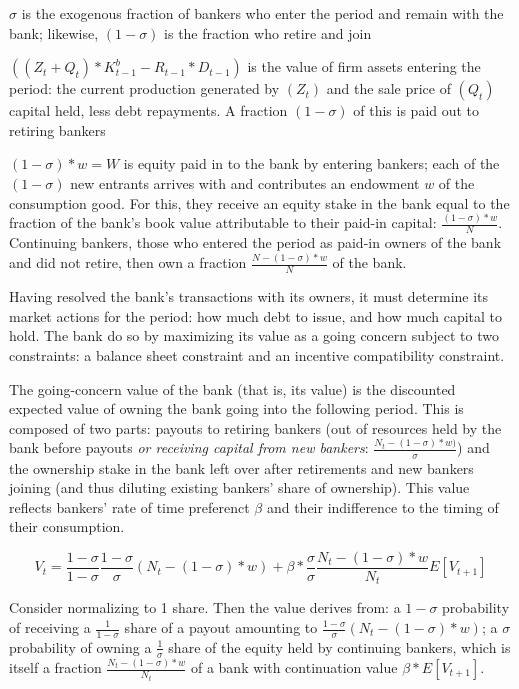 \documentclass[english]{article}
\begin{document}
$\sigma$ is the exogenous fraction of bankers who enter the period and remain with the bank; likewise, $(1-\sigma)$ is the fraction who retire and join

$\left((Z_t + Q_t)*K^b_{t-1} - R_{t-1}*D_{t-1}\right)$ is the value of firm assets entering the period:
the current production generated by $(Z_t)$ and the sale price of $(Q_t)$ capital held, less debt repayments. A fraction 
$(1-\sigma)$ of this is paid out to retiring bankers

$(1 - \sigma)*w=W$ is equity paid in to the bank by entering bankers; each of the $(1-\sigma)$ new entrants
arrives with and contributes an endowment $w$ of the consumption good. For this, they receive an
equity stake in the bank equal to the fraction of the bank's book value attributable to their paid-in 
capital: $\frac{(1 - \sigma)*w}{N}$. Continuing bankers, those 
who entered the period as paid-in owners of the bank and did not retire, then own a fraction 
$\frac{N - (1-\sigma)*w}{N}$ of the bank.

Having resolved the bank's transactions with its owners, it must determine its market actions for the 
period: how much debt to issue, and how much capital to hold. The bank do so by maximizing its value 
as a going concern subject to two constraints: a balance sheet constraint and an incentive compatibility 
constraint.

The going-concern value of the bank (that is, its value) is the discounted expected value of owning the bank going into the following 
period. This is composed of two parts: payouts to retiring bankers (out of resources held by the bank 
before payouts \emph{or receiving capital from new bankers}: $\frac{N_t - (1-\sigma)*w)}{\sigma}$) 
and the ownership stake in the bank left over after retirements and new bankers joining (and thus 
diluting existing bankers' share of ownership). This value reflects bankers' rate of time preferenct 
$\beta$ and their indifference to the timing of their consumption.

\begin{equation}V_{t} =  \frac{1-\sigma}{1 - \sigma}\frac{1-\sigma}{\sigma}(N_t - (1-\sigma)*w) + \beta*\frac{\sigma}{\sigma}\frac{N_t - (1-\sigma)*w}{N_t}E\left[V_{t+1}\right]                                                        \end{equation}

Consider normalizing to 1 share. Then the value derives from: a $1-\sigma$ probability of receiving a $\frac{1}{1-\sigma}$ share 
of a payout amounting to $\frac{1-\sigma}{\sigma}(N_t - (1-\sigma)*w)$; a $\sigma$ probability of 
owning a $\frac{1}{\sigma}$ share of the equity held by continuing bankers, which is itself a fraction 
$\frac{N_t - (1 - \sigma)*w}{N_t}$ of a bank with continuation value $\beta*E\left[V_{t+1}\right]$.
\end{document}
